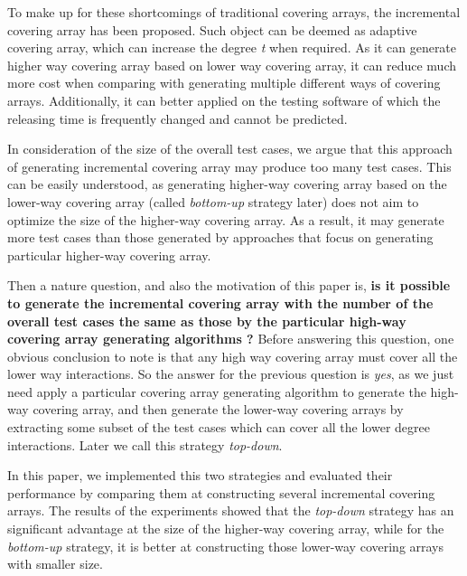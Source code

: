 \documentclass[conference]{IEEEtran}
\theoremstyle{definition}
\begin{document}

To make up for these shortcomings of traditional covering arrays, the incremental covering array \cite{fouche2009incremental} has been proposed. Such object can be deemed as adaptive covering array, which can increase the degree \emph{t} when required. As it can generate higher way covering array based on lower way covering array, it can reduce much more cost when comparing with generating multiple different ways of covering arrays. Additionally, it can better applied on the testing software of which the releasing time is  frequently changed and cannot be predicted.


In consideration of the size of the overall test cases, we argue that this approach of generating incremental covering array may produce too many test cases. This can be easily understood, as generating higher-way covering array based on the lower-way covering array (called \emph{bottom-up} strategy later) does not aim to optimize the size of the higher-way covering array. As a result, it may generate more test cases than those generated by approaches that focus on generating particular higher-way covering array.

Then a nature question, and also the motivation of this paper is, \textbf{is it possible to generate the incremental covering array with the number of the overall test cases the same as those by the particular high-way covering array generating algorithms ?}  Before answering this question, one obvious conclusion to note is that any high way covering array must cover all the lower way interactions. So the answer for the previous question is \emph{yes}, as we just need apply a particular covering array generating algorithm to generate the high-way covering array, and then generate the lower-way covering arrays by extracting some subset of the test cases which can cover all the lower degree interactions. Later we call this strategy \emph{top-down}.

In this paper, we implemented this two strategies and evaluated their performance by comparing them at constructing several incremental covering arrays. The results of the experiments showed that the \emph{top-down} strategy has an significant advantage at the size of the higher-way covering array, while for the \emph{bottom-up} strategy, it is better at constructing those lower-way covering arrays with smaller size.

%
\end{document}
